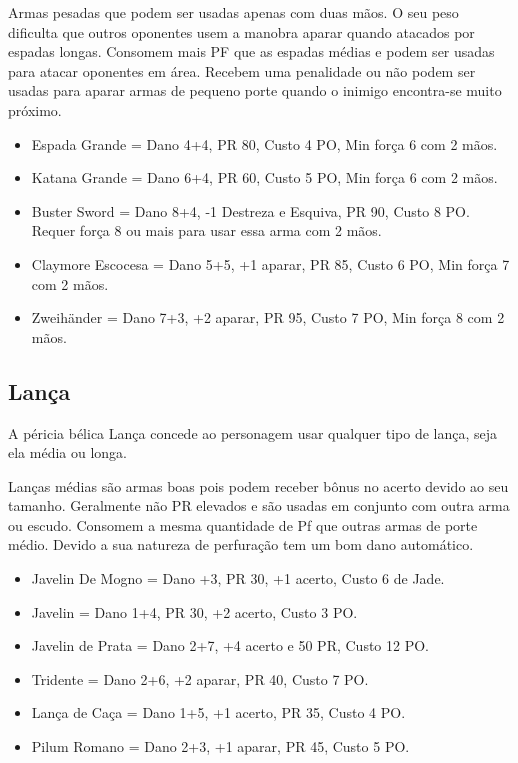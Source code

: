 Armas pesadas que podem ser usadas apenas com duas mãos. O seu peso dificulta que outros oponentes usem a manobra aparar quando atacados por espadas longas. Consomem mais PF que as espadas médias e podem ser usadas para atacar oponentes em área. Recebem uma penalidade ou não podem ser usadas para aparar armas de pequeno porte quando o inimigo encontra-se muito próximo.

\begin{itemize}
	\item Espada Grande = Dano 4+4, PR 80, Custo 4 PO, Min força 6 com 2 mãos.
	\item Katana Grande = Dano 6+4, PR 60, Custo 5 PO, Min força 6 com 2 mãos.
	\item Buster Sword = Dano 8+4, -1 Destreza e Esquiva, PR 90, Custo 8 PO. Requer força 8 ou mais para usar essa arma com 2 mãos.
	\item Claymore Escocesa = Dano 5+5, +1 aparar, PR 85, Custo 6 PO, Min força 7 com 2 mãos.
	\item Zweihänder = Dano 7+3, +2 aparar, PR 95, Custo 7 PO, Min força 8 com 2 mãos.
\end{itemize}

\subsection{Lança}
A péricia bélica Lança concede ao personagem usar qualquer tipo de lança, seja ela média ou longa.

Lanças médias são armas boas pois podem receber bônus no acerto devido ao seu tamanho. Geralmente não PR elevados e são usadas em conjunto com outra arma ou escudo. Consomem a mesma quantidade de Pf que outras armas de porte médio. Devido a sua natureza de perfuração tem um bom dano automático.

\begin{itemize}

	\item Javelin De Mogno = Dano +3, PR 30, +1 acerto, Custo 6 de Jade.
	\item Javelin = Dano 1+4, PR 30, +2 acerto, Custo 3 PO.
	\item Javelin de Prata = Dano 2+7, +4 acerto e 50 PR, Custo 12 PO.
	\item Tridente = Dano 2+6, +2 aparar, PR 40, Custo 7 PO.
	\item Lança de Caça = Dano 1+5, +1 acerto, PR 35, Custo 4 PO.
	\item Pilum Romano = Dano 2+3, +1 aparar, PR 45, Custo 5 PO.
	
\end{itemize}

